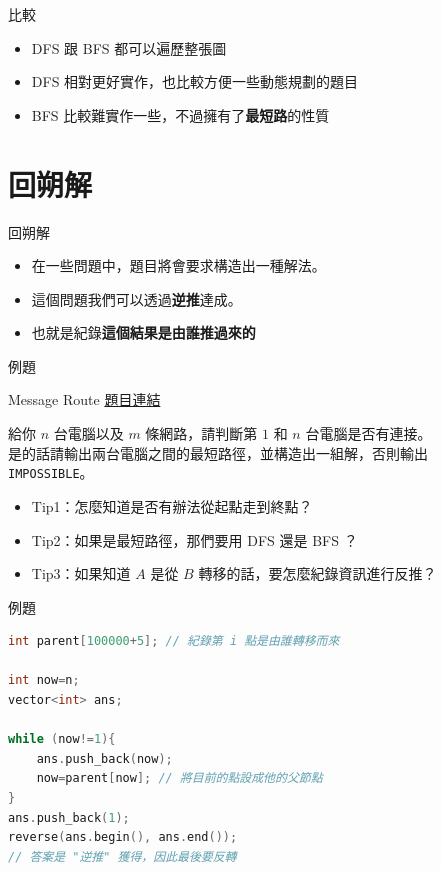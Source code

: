 \documentclass[mathserif]{beamer}
\begin{document}
\begin{frame}{比較}
    \begin{itemize}
        \item DFS 跟 BFS 都可以遍歷整張圖
        \item DFS 相對更好實作，也比較方便一些動態規劃的題目
        \item BFS 比較難實作一些，不過擁有了\textbf{最短路}的性質
    \end{itemize}
\end{frame}

\section{回朔解}

\begin{frame}{回朔解}
    \begin{itemize}
        \item 在一些問題中，題目將會要求構造出一種解法。
        \item 這個問題我們可以透過\textbf{逆推}達成。
        \item 也就是紀錄\textbf{這個結果是由誰推過來的}
    \end{itemize}
\end{frame}

\begin{frame}{例題}
    \begin{block}{Message Route}
        \href{https://cses.fi/problemset/task/1667}{題目連結}
        
        給你 $n$ 台電腦以及 $m$ 條網路，請判斷第 $1$ 和 $n$ 台電腦是否有連接。\\

        \vspace{1em}
        是的話請輸出兩台電腦之間的最短路徑，並構造出一組解，否則輸出\texttt{IMPOSSIBLE}。
    \end{block}
    \begin{itemize}
        \item<2-> Tip1：怎麼知道是否有辦法從起點走到終點？
        \item<3-> Tip2：如果是最短路徑，那們要用 DFS 還是 BFS ？
        \item<4-> Tip3：如果知道 $A$ 是從 $B$ 轉移的話，要怎麼紀錄資訊進行反推？
    \end{itemize}
\end{frame}

\begin{frame}[fragile]{例題}
\begin{lstlisting}[language=C++, caption={}]
int parent[100000+5]; // 紀錄第 i 點是由誰轉移而來

int now=n;
vector<int> ans;

while (now!=1){
    ans.push_back(now);
    now=parent[now]; // 將目前的點設成他的父節點
}
ans.push_back(1);
reverse(ans.begin(), ans.end());
// 答案是 "逆推" 獲得，因此最後要反轉
\end{lstlisting}
\end{frame}
\end{document}

